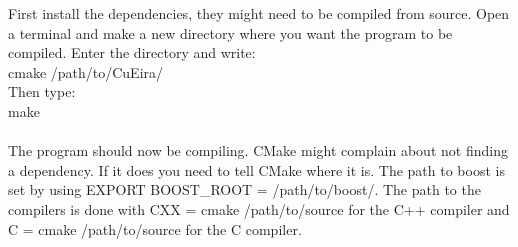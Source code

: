 \documentclass[10pt,a4paper]{report}
\begin{document}
\begin{appendices}
First install the dependencies, they might need to be compiled from source. Open a terminal and make a new directory where you want the program to be compiled. Enter the directory and write:\\
cmake /path/to/CuEira/\\
Then type:\\
make\\
\\
The program should now be compiling. CMake might complain about not finding a dependency. If it does you need to tell CMake where it is. The path to boost is set by using EXPORT BOOST\_ROOT = /path/to/boost/. The path to the compilers is done with CXX = cmake /path/to/source for the C++ compiler and C = cmake /path/to/source for the C compiler.


\end{appendices}
\end{document}
